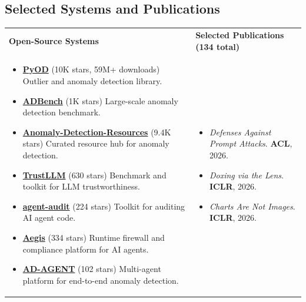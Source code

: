 \documentclass[margin,line,pifont,palatino,courier]{res}
\begin{document}
\begin{resume}
\section{\sc Selected Systems and Publications}
{\small
\begin{tabular}{@{}p{}p{}}
\textbf{Open-Source Systems} & \textbf{Selected Publications (134 total)} \\
\begin{minipage}[t]{0.47\textwidth}
\begin{itemize}[leftmargin=*,itemsep=0.08em,topsep=0.08em]
\item \textbf{\href{https://github.com/yzhao062/pyod}{PyOD}} (\textcolor{uscred}{10K stars, 59M+ downloads}) Outlier and anomaly detection library.
\item \textbf{\href{https://github.com/Minqi824/ADBench}{ADBench}} (\textcolor{uscred}{1K stars}) Large-scale anomaly detection benchmark.
\item \textbf{\href{https://github.com/yzhao062/anomaly-detection-resources}{Anomaly-Detection-Resources}} (\textcolor{uscred}{9.4K stars}) Curated resource hub for anomaly detection.
\item \textbf{\href{https://github.com/HowieHwong/TrustLLM}{TrustLLM}} (\textcolor{uscred}{630 stars}) Benchmark and toolkit for LLM trustworthiness.
\item \textbf{\href{https://github.com/HeadyZhang/agent-audit}{agent-audit}} (\textcolor{uscred}{224 stars}) Toolkit for auditing AI agent code.
\item \textbf{\href{https://github.com/Justin0504/Aegis}{Aegis}} (\textcolor{uscred}{334 stars}) Runtime firewall and compliance platform for AI agents.
\item \textbf{\href{https://github.com/USC-FORTIS/AD-AGENT}{AD-AGENT}} (\textcolor{uscred}{102 stars}) Multi-agent platform for end-to-end anomaly detection.
\end{itemize}
\end{minipage}
&
\begin{minipage}[t]{0.47\textwidth}
\begin{itemize}[leftmargin=*,itemsep=0.08em,topsep=0.08em]
\item \textit{Defenses Against Prompt Attacks}. \textbf{ACL}, 2026.
\item \textit{Doxing via the Lens}. \textbf{ICLR}, 2026.
\item \textit{Charts Are Not Images}. \textbf{ICLR}, 2026.

\end{itemize}
\end{minipage}
\end{tabular}}
\end{resume}
\end{document}
